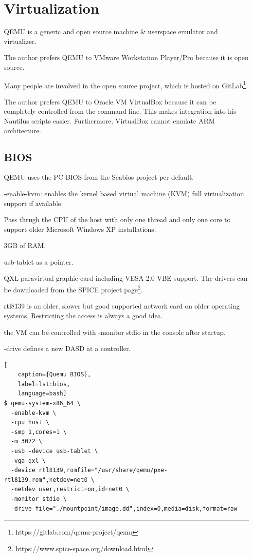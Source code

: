 \section{Virtualization}

QEMU is a generic and open source machine \& userspace emulator and
virtualizer.

The author prefers QEMU to VMware Workstation Player/Pro because it is open source.

Many people are involved in the open source project, which is hosted on  GitLab\footnote{https://gitlab.com/qemu-project/qemu}.

The author prefers QEMU to Oracle VM VirtualBox because it can be completely controlled from the command line. This makes integration into his Nautilus scripts easier. Furthermore, VirtualBox cannot emulate ARM architecture.

\subsection{BIOS}

QEMU uses the PC BIOS from the Seabios project per default.

-enable-kvm: enables the kernel based virtual machine (KVM) full virtualization support if available.

Pass thrugh the CPU of the host with only one thread and only one core to support older Microsoft Windows XP installations.

3GB of RAM.

usb-tablet as a pointer.

QXL paravirtual graphic card including VESA 2.0 VBE support. The drivers can be downloaded from the SPICE project page\footnote{https://www.spice-space.org/download.html}.

rtl8139 is an older, slower but good supported network card on older operating systems. Restricting the access is always a good idea.

the VM can be controlled with -monitor stdio in the console after startup.

-drive defines a new DASD at a controller.

\begin{lstlisting}[
    caption={Quemu BIOS},
    label=lst:bios,
    language=bash]
$ qemu-system-x86_64 \
  -enable-kvm \
  -cpu host \
  -smp 1,cores=1 \
  -m 3072 \
  -usb -device usb-tablet \
  -vga qxl \
  -device rtl8139,romfile="/usr/share/qemu/pxe-rtl8139.rom",netdev=net0 \
  -netdev user,restrict=on,id=net0 \
  -monitor stdio \
  -drive file="./mountpoint/image.dd",index=0,media=disk,format=raw
\end{lstlisting}

